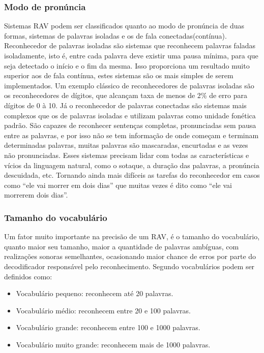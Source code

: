 \subsubsection{Modo de pronúncia}
Sistemas RAV podem ser classificados quanto ao modo de pronúncia de duas formas, sistemas de palavras isoladas e os de fala conectadas(contínua). Reconhecedor de palavras isoladas são sistemas que reconhecem palavras faladas isoladamente, isto é, entre cada palavra deve existir uma pausa mínima, para que seja detectado o início e o fim da mesma. Isso proporciona um resultado muito superior aos de fala contínua, estes sistemas são os mais simples de serem implementados. Um exemplo clássico de reconhecedores de palavras isoladas são os reconhecedores de dígitos, que alcançam taxa de menos de 2{\%} de erro para dígitos de 0 à 10.\cite{RavPtBr}
Já o reconhecedor de palavras conectadas são sistemas mais complexos que os de palavras isoladas e utilizam palavras como unidade fonética padrão. São capazes de reconhecer sentenças completas, pronunciadas sem pausa entre as palavras, e por isso não se tem informação de onde começam e terminam determinadas palavras, muitas palavras são mascaradas, encurtadas e as vezes não pronunciadas. Esses sistemas precisam lidar com todas as características e vícios da linguagem natural, como o sotaque, a duração das palavras, a pronúncia descuidada, etc. Tornando ainda mais difíceis as tarefas do reconhecedor em casos como “ele vai morrer em dois dias” que 
muitas vezes  é dito como “ele vai morrerem dois dias”.\cite{RavPtBr}

\subsubsection{Tamanho do vocabulário}
Um fator muito importante na precisão de um RAV, é o tamanho do vocabulário, quanto maior seu tamanho, maior a quantidade de palavras ambíguas, com realizações sonoras semelhantes, ocasionando maior chance de erros por parte do decodificador responsável pelo reconhecimento.\cite{RavPtBr} Segundo \cite{RavIsoladas} vocabulários podem ser definidos como:

\begin{itemize}
\item Vocabulário pequeno: reconhecem até 20 palavras. 
\item Vocabulário médio: reconhecem entre 20 e 100 palavras. 
\item Vocabulário grande: reconhecem entre 100 e 1000 palavras. 
\item Vocabulário muito grande: reconhecem mais de 1000 palavras. 
\end{itemize}

